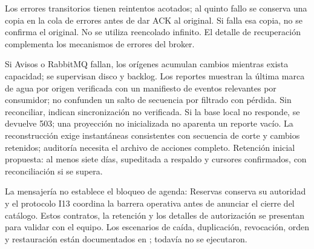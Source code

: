 Los errores transitorios tienen reintentos acotados; al quinto fallo se
conserva una copia en la cola de errores antes de dar ACK al original.
Si falla esa copia, no se confirma el original. No se utiliza reencolado
infinito. El detalle de recuperación complementa los mecanismos de errores
del broker\cite{nixonRabbitDLX}.

Si Avisos o RabbitMQ fallan, los orígenes acumulan cambios mientras exista
capacidad; se supervisan disco y backlog. Los reportes muestran la última
marca de agua por origen verificada con un manifiesto de eventos relevantes
por consumidor; no confunden un salto de secuencia por filtrado con pérdida.
Sin reconciliar, indican sincronización no verificada. Si la base local
no responde, se devuelve 503; una proyección no inicializada no aparenta un
reporte vacío. La reconstrucción exige instantáneas consistentes con
secuencia de corte y cambios retenidos; auditoría necesita el archivo de
acciones completo. Retención inicial propuesta: al menos siete días,
supeditada a respaldo y cursores confirmados, con reconciliación si se supera.

La mensajería no establece el bloqueo de agenda: Reservas conserva su
autoridad y el protocolo I13 coordina la barrera operativa antes de anunciar
el cierre del catálogo. Estos contratos, la retención y los detalles de
autorización se presentan para validar con el equipo. Los escenarios de
caída, duplicación, revocación, orden y restauración están documentados en
; todavía no se ejecutaron.
